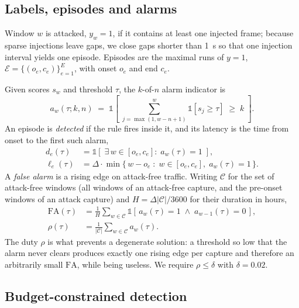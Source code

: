 \documentclass[preprint,11pt,authoryear]{elsarticle}
\newcommand{\FA}{\mathrm{FA}}
\begin{document}
\subsection{Labels, episodes and alarms}

Window $w$ is attacked, $y_w=1$, if it contains at least one injected frame; because sparse
injections leave gaps, we close gaps shorter than \SI{1}{\second} so that one injection interval
yields one episode. Episodes are the maximal runs of $y=1$,
$\mathcal{E}=\{(o_e,c_e)\}_{e=1}^{E}$, with onset $o_e$ and end $c_e$.

Given scores $s_w$ and threshold $\tau$, the $k$-of-$n$ alarm indicator is
\begin{equation}
a_w(\tau;k,n) \;=\; \mathbb{1}\!\left[\;\sum_{j=\max(1,w-n+1)}^{w}\mathbb{1}[s_j\ge\tau]\;\ge\;k\;\right].
\label{eq:kofn}
\end{equation}
An episode is \emph{detected} if the rule fires inside it, and its latency is the time from onset to
the first such alarm,
\begin{align}
d_e(\tau) &= \mathbb{1}\!\left[\;\exists\,w\in[o_e,c_e]:\; a_w(\tau)=1\;\right], \label{eq:detect}\\[2pt]
\ell_e(\tau) &= \Delta\cdot\min\big\{\,w-o_e \;:\; w\in[o_e,c_e],\; a_w(\tau)=1\,\big\}. \label{eq:latency}
\end{align}
A \emph{false alarm} is a rising edge on attack-free traffic. Writing $\mathcal{C}$ for the set of
attack-free windows (all windows of an attack-free capture, and the pre-onset windows of an attack
capture) and $H=\Delta|\mathcal{C}|/3600$ for their duration in hours,
\begin{align}
\FA(\tau) &= \frac{1}{H}\sum_{w\in\mathcal{C}}
             \mathbb{1}\!\left[\,a_w(\tau)=1 \;\wedge\; a_{w-1}(\tau)=0\,\right], \label{eq:fa}\\[2pt]
\rho(\tau) &= \frac{1}{|\mathcal{C}|}\sum_{w\in\mathcal{C}} a_w(\tau). \label{eq:duty}
\end{align}
The duty $\rho$ is what prevents a degenerate solution: a threshold so low that the alarm never
clears produces exactly one rising edge per capture and therefore an arbitrarily small $\FA$, while
being useless. We require $\rho\le\delta$ with $\delta=0.02$.

\subsection{Budget-constrained detection}
\end{document}
